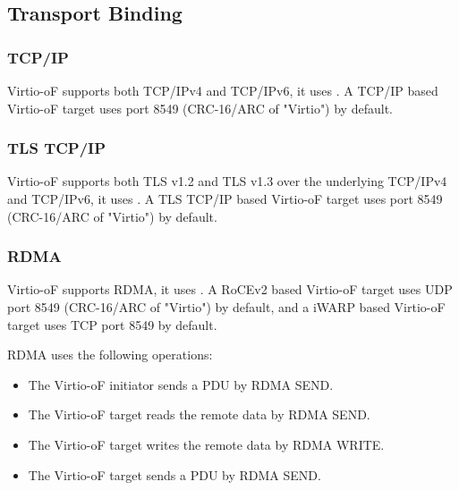 \subsection{Transport Binding}\label{sec:Virtio Transport Options / Virtio Over Fabrics / Transport Binding}

\subsubsection{TCP/IP}\label{sec:Virtio Transport Options / Virtio Over Fabrics / Transport Binding / TCP IP}
Virtio-oF supports both TCP/IPv4 and TCP/IPv6, it uses
.
A TCP/IP based Virtio-oF target uses port 8549 (CRC-16/ARC of "Virtio") by default.

\subsubsection{TLS TCP/IP}\label{sec:Virtio Transport Options / Virtio Over Fabrics / Transport Binding / TLS TCP IP}
Virtio-oF supports both TLS v1.2 and TLS v1.3 over the underlying TCP/IPv4 and TCP/IPv6, it uses
.
A TLS TCP/IP based Virtio-oF target uses port 8549 (CRC-16/ARC of "Virtio") by default.

\subsubsection{RDMA}\label{sec:Virtio Transport Options / Virtio Over Fabrics / Transport Binding / RDMA}
Virtio-oF supports RDMA, it uses
.
A RoCEv2 based Virtio-oF target uses UDP port 8549 (CRC-16/ARC of "Virtio") by default, and a iWARP based Virtio-oF target uses TCP port 8549 by default.

RDMA uses the following operations:
\begin{itemize}
\item The Virtio-oF initiator sends a PDU by RDMA SEND.
\item The Virtio-oF target reads the remote data by RDMA SEND.
\item The Virtio-oF target writes the remote data by RDMA WRITE.
\item The Virtio-oF target sends a PDU by RDMA SEND.
\end{itemize}
